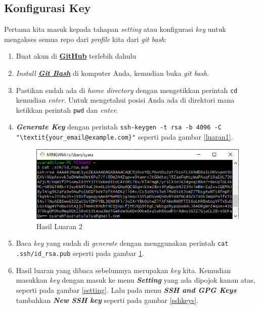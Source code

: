 \subsection{Konfigurasi Key}
Pertama kita masuk kepada tahapan \textit{setting} atau konfigurasi \textit{key} untuk mengakses semua repo dari \textit{profile} kita dari \textit{git bash}:
\begin{enumerate}

\item Buat akun di \href{https://www.github.com}{\textbf{GitHub}} terlebih dahulu
\item \textit{Install \href{https://git-scm.com/downloads}{\textbf{Git Bash}}} di komputer Anda, kemudian buka \textit{git bash}.
\item Pastikan sudah ada di \textit{home directory} dengan mengetikkan perintah \verb|cd| kemudian \textit{enter}. Untuk mengetahui posisi Anda ada di direktori mana ketikkan perintah \verb|pwd| dan \textit{enter}.
\item \textbf{\textit{Generate Key}} dengan perintah 
\verb|ssh-keygen -t rsa -b 4096 -C "\textit{your_email@example.com}"|
seperti pada gambar \ref{luaran1}.
\begin{figure}[!htbp]
\centerline{\includegraphics[width=75\textwidth]{Figures/langkah2.PNG}}
\caption{Hasil Luaran 2}
\label{luaran2}
\end{figure}
\item Baca \textit{key} yang sudah di \textit{generate} dengan menggunakan perintah 
\verb|cat .ssh/id_rsa.pub| seperti pada gambar \ref{luaran2}.
\item Hasil luaran yang dibaca sebelumnya merupakan \textit{key} kita. Kemudian masukkan \textit{key} dengan masuk ke menu \textbf{\textit{Setting}} yang ada dipojok kanan atas, seperti pada gambar \ref{setting}. Lalu pada menu \textit{\textbf{SSH and GPG Keys}} tambahkan \textit{\textbf{New SSH key}} seperti pada gambar \ref{sshkeys}.
\begin{figure}[!htbp]

\end{figure}
\end{enumerate}
